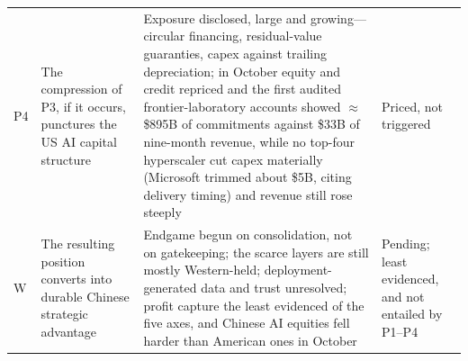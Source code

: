 \begin{table}[htbp]
\begin{tabular}{@{}p{9mm}p{40mm}p{55mm}p{28mm}@{}}
\addlinespace
P4 & The compression of P3, if it occurs, punctures the US AI capital structure & Exposure disclosed, large and growing---circular financing, residual-value guaranties, capex against trailing depreciation; in October equity and credit repriced and the first audited frontier-laboratory accounts showed $\approx$\$895B of commitments against \$33B of nine-month revenue, while no top-four hyperscaler cut capex materially (Microsoft trimmed about \$5B, citing delivery timing) and revenue still rose steeply & Priced, not triggered \\
\addlinespace
W & The resulting position converts into durable Chinese strategic advantage & Endgame begun on consolidation, not on gatekeeping; the scarce layers are still mostly Western-held; deployment-generated data and trust unresolved; profit capture the least evidenced of the five axes, and Chinese AI equities fell harder than American ones in October & Pending; least evidenced, and not entailed by P1--P4 \\
\bottomrule
\end{tabular}
\end{table}

